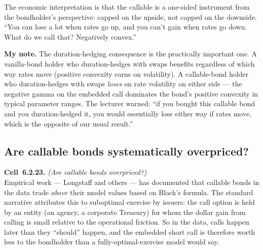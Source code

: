 The economic interpretation is that the callable is a one-sided
instrument from the bondholder's perspective: capped on the upside,
not capped on the downside. ``You can lose a lot when rates go up, and
you can't gain when rates go down. What do we call that? Negatively
convex.''

\begin{checkpoint}
\textbf{My note.} The duration-hedging consequence is the practically
important one. A vanilla-bond holder who duration-hedges with swaps
benefits regardless of which way rates move (positive convexity earns
on volatility). A callable-bond holder who duration-hedges with swaps
\emph{loses} on rate volatility on either side --- the negative gamma
on the embedded call dominates the bond's positive convexity in
typical parameter ranges. The lecturer warned: ``if you bought this
callable bond and you duration-hedged it, you would essentially lose
either way if rates move, which is the opposite of our usual
result.''
\end{checkpoint}

\subsection{Are callable bonds systematically overpriced?}\label{L5-sec:longstaff}

\begin{keyblock}
\textbf{Cell~6.2.23.} \emph{(Are callable bonds overpriced?)}\\
Empirical work --- Longstaff and others --- has documented that
callable bonds in the data trade \emph{above} their model values
based on Black's formula. The standard narrative attributes this to
suboptimal exercise by issuers: the call option is held by an entity
(an agency, a corporate Treasury) for whom the dollar gain from
calling is small relative to the operational friction. So in the
data, calls happen later than they ``should'' happen, and the
embedded short call is therefore worth less to the bondholder than a
fully-optimal-exercise model would say.
\end{keyblock}

